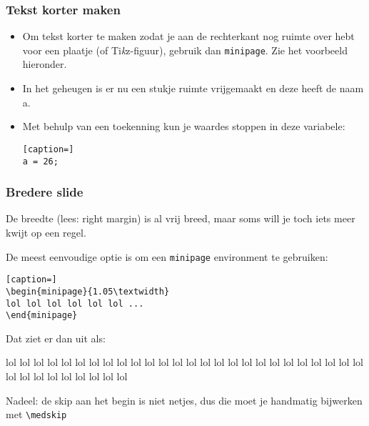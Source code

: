 \documentclass[fleqn,aspectratio=169,dutch,10pt]{beamer}
\begin{document}
\begin{frame}[fragile]
\frametitle{Tekst korter maken}
\begin{itemize}
\item Om tekst korter te maken zodat je aan de rechterkant nog ruimte over hebt voor een plaatje (of Ti\emph{k}z-figuur), gebruik dan \lstinline|minipage|. Zie het voorbeeld hieronder.
\end{itemize}
\bigskip
\begin{minipage}{0.5\linewidth}
\begin{itemize}
\item In het geheugen is er nu een stukje ruimte 
vrijgemaakt en deze heeft de naam a.
\item Met behulp van een toekenning kun je waardes 
stoppen in deze variabele:
\begin{lstlisting}[caption=]
a = 26;
\end{lstlisting}
\end{itemize}
\end{minipage}\hfil%
\begin{minipage}{0.2\linewidth}
\end{minipage}
\end{frame}


\begin{frame}[fragile]
\frametitle{Bredere slide}
\begin{itemize}
\item De breedte (lees: right margin) is al vrij breed, maar soms will je toch iets meer kwijt op een regel.
\item De meest eenvoudige optie is om een \lstinline|minipage| environment te gebruiken:
\begin{lstlisting}[caption=]
\begin{minipage}{1.05\textwidth}
lol lol lol lol lol lol ...
\end{minipage}
\end{lstlisting}

\item Dat ziet er dan uit als:

\medskip
\begin{minipage}{1.05\textwidth}
\item lol lol lol lol lol lol lol lol lol lol lol lol lol lol lol lol lol lol lol lol lol lol lol lol lol lol lol lol lol lol lol lol lol lol lol
\end{minipage}

\item Nadeel: de skip aan het begin is niet netjes, dus die moet je handmatig bijwerken met \lstinline|\medskip|
\end{itemize}
\end{frame}
\end{document}
